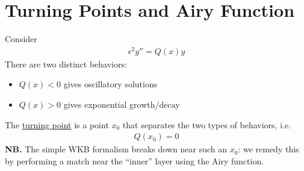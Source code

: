 \chapter[Turning points]{Turning Points and Airy Function}\label{sec:turning-points}
Consider
\begin{gather*}
	\epsilon^2 y'' = Q(x) y
\end{gather*}
There are two distinct behaviors:
\begin{itemize}
	\item $Q(x)<0$ gives oscillatory solutions
	\item $Q(x)>0$ gives exponential growth/decay
\end{itemize}
The \underline{turning point} is a point $x_0$ that separates the two types of behaviors, i.e.
\begin{gather*}
	Q(x_0)=0
\end{gather*} 
{\bf NB.} The simple WKB formalism breaks down near such an $x_0$: we remedy this by performing a match near the ``inner'' layer using the Airy function. 

